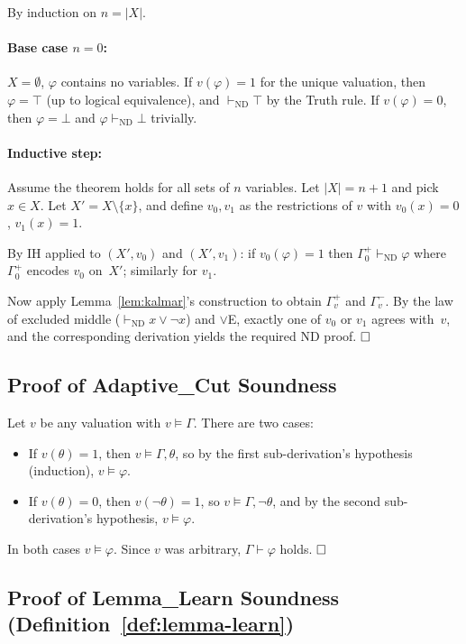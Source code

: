 \documentclass[conference]{IEEEtran}
\newcommand{\proves}{\vdash}
\begin{document}
By induction on $n = |X|$.

\paragraph{Base case $n=0$:} $X = \emptyset$, $\varphi$ contains no
variables.  If $v(\varphi)=1$ for the unique valuation, then
$\varphi = \top$ (up to logical equivalence), and
$\proves_{\mathrm{ND}} \top$ by the Truth rule.
If $v(\varphi)=0$, then $\varphi = \bot$ and
$\varphi \proves_{\mathrm{ND}} \bot$ trivially.

\paragraph{Inductive step:} Assume the theorem holds for all sets of
$n$ variables.  Let $|X| = n+1$ and pick $x \in X$.
Let $X' = X \setminus \{x\}$, and define
$v_0, v_1$ as the restrictions of $v$ with $v_0(x)=0$, $v_1(x)=1$.

By IH applied to $(X', v_0)$ and $(X', v_1)$:
if $v_0(\varphi)=1$ then $\Gamma_0^+ \proves_{\mathrm{ND}} \varphi$ where
$\Gamma_0^+$ encodes $v_0$ on~$X'$; similarly for $v_1$.

Now apply Lemma~\ref{lem:kalmar}'s construction to obtain
$\Gamma_v^+$ and $\Gamma_v^{-}$.  By the law of excluded middle
($\proves_{\mathrm{ND}} x \vee \neg x$) and $\vee$E, exactly one of
$v_0$ or $v_1$ agrees with~$v$, and the corresponding derivation
yields the required ND proof.  $\hfill\square$

\subsection{Proof of Adaptive\_Cut Soundness}

Let $v$ be any valuation with $v \models \Gamma$.
There are two cases:
\begin{itemize}
  \item If $v(\theta) = 1$, then $v \models \Gamma, \theta$, so by the
    first sub-derivation's hypothesis (induction), $v \models \varphi$.
  \item If $v(\theta) = 0$, then $v(\neg\theta) = 1$, so
    $v \models \Gamma, \neg\theta$, and by the second sub-derivation's
    hypothesis, $v \models \varphi$.
\end{itemize}
In both cases $v \models \varphi$.  Since $v$ was arbitrary,
$\Gamma \proves \varphi$ holds.  $\hfill\square$

\subsection{Proof of Lemma\_Learn Soundness
  (Definition~\ref{def:lemma-learn})}
\end{document}
